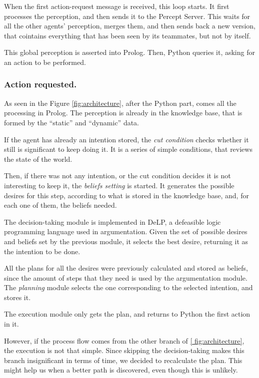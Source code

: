 \documentclass{llncs2e/llncs}
\begin{document}
    When the first action-request message is received, this loop starts. It 
    first processes the perception, and then sends it to the Percept Server. 
    This waits for all the other agents' perception, merges them, and then sends 
    back a new version, that cointains everything that has been seen by its
    teammates, but not by itself.
    
    This global perception is asserted into Prolog. Then, Python queries it, asking for an action to be performed.
    
\subsubsection{Action requested.}

    As seen in the Figure \ref{fig:architecture}, after the Python part, comes 
    all the processing in Prolog. The perception is already in the knowledge 
    base, that is formed by the ``static'' and ``dynamic'' data. 

    If the agent has already an intention stored, the \textit{cut condition} 
    checks whether it still is significant to keep doing it. It is a series of 
    simple conditions, that reviews the state of the world.

    Then, if there was not any intention, or the cut condition decides it is not 
    interesting to keep it, the \textit{beliefs setting} is started. It 
    generates the possible desires for this step, according to what is stored in 
    the knowledge base, and, for each one of them, the beliefs needed.

    The decision-taking module is implemented in DeLP, a defeasible logic 
    programming language used in argumentation. Given the set of possible 
    desires and beliefs set by the previous module, it selects the best desire, 
    returning it as the intention to be done.

    All the plans for all the desires were previously calculated and stored as 
    beliefs, since the amount of steps that they need is used by the 
    argumentation module. The \textit{planning} module selects the one 
    corresponding to the selected intention, and stores it.

    The execution module only gets the plan, and returns to Python the first 
    action in it.

    However, if the process flow comes from the other branch of \ref{
    fig:architecture}, the execution is not that simple. Since skipping the 
    decision-taking makes this branch insignificant in terms of time, we decided 
    to recalculate the plan. This might help us when a better path is 
    discovered, even though this is unlikely.
\end{document}
